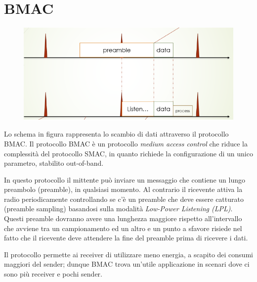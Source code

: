 
\section{BMAC}

\begin{figure}[htbp]
   \centering
   \includegraphics{images/questions/Schermata del 2023-10-20 11-36-52.png}
   \label{fig:dom18}
\end{figure}

Lo schema in figura rappresenta lo scambio di dati attraverso il protocollo BMAC. Il protocollo BMAC è un protocollo \emph{medium access control} che riduce la complessità del protocollo SMAC, in quanto richiede la configurazione di un unico parametro, stabilito out-of-band.

In questo protocollo il mittente può inviare un messaggio che contiene un lungo preambolo (preamble), in qualsiasi momento. Al contrario il ricevente attiva la radio periodicamente controllando se c'è un preamble che deve essere catturato (preamble sampling) basandosi sulla modalità \emph{Low-Power Listening (LPL)}.\\
Questi preamble dovranno avere una lunghezza maggiore rispetto all'intervallo che avviene tra un campionamento ed un altro e un punto a sfavore risiede nel fatto che il ricevente deve attendere la fine del preamble prima di ricevere i dati.

Il protocollo permette ai receiver di utilizzare meno energia, a scapito dei consumi maggiori del sender; dunque BMAC trova un'utile applicazione in scenari dove ci sono più receiver e pochi sender.

